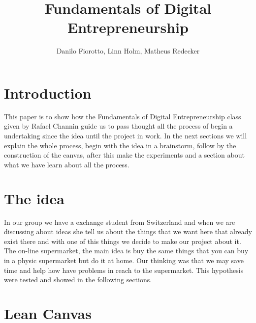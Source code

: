 \documentclass[12pt]{article}
\title{Fundamentals of Digital Entrepreneurship}
\author{Danilo Fiorotto\inst{1}, Linn Holm\inst{1}, Matheus Redecker\inst{1} }
\begin{document}
 

\maketitle

\section{Introduction}
This paper is to show how the Fundamentals of Digital Entrepreneurship class given by Rafael Channin guide us to pass thought all the process of begin a undertaking since the idea until the project in work. In the next sections we will explain the whole process, begin with the idea in a brainstorm, follow by the construction of the canvas, after this make the experiments and a section about what we have learn about all the process.

\section{The idea}
In our group we have a exchange student from Switzerland and when we are discussing about ideas she tell us about the things that we want here that already exist there and with one of this things we decide to make our project about it. The on-line supermarket, the main idea is buy the same things that you can buy in a physic supermarket but do it at home. Our thinking was that we may save time and help how have problems in reach to the supermarket. This hypothesis were tested and showed in the following sections.

\section{Lean Canvas}
\end{document}
